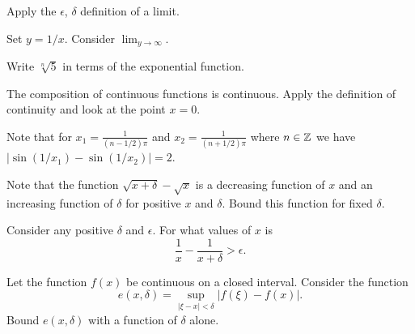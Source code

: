 

\begin{Hint}
  \label{hint lim sin 1/x}
  Apply the $\epsilon$, $\delta$ definition of a limit.
\end{Hint}





\begin{Hint}
  \label{hint lim x sin 1/x}
  Set $y = 1/x$.  Consider $\lim_{y \to \infty}$.
\end{Hint}


\begin{Hint}
  \label{hint limit sqrt n 5}
  Write $\sqrt[n]{5}$ in terms of the exponential function.
\end{Hint}





\begin{Hint}
  \label{hint sin 1/x continuous}
  The composition of continuous functions is continuous.
  Apply the definition of continuity and look at the point $x = 0$.
\end{Hint}


\begin{Hint}
  \label{hint sin 1/x uniformly continuous}
  Note that for $x_1 = \frac{1}{(n-1/2) \pi}$ and $x_2 = \frac{1}{(n+1/2) \pi}$ 
  where $n \in \mathbb{Z}$ we have $| \sin(1/x_1) - \sin(1/x_2)| = 2$.  
\end{Hint}


\begin{Hint}
  \label{hint sqrt x uniformly continuous}
  Note that the function $\sqrt{x + \delta} - \sqrt{x}$ is a decreasing 
  function of $x$ and an increasing function of $\delta$ for positive $x$ 
  and $\delta$.  Bound this function for fixed $\delta$.

  Consider any positive $\delta$ and $\epsilon$.  For what values of $x$ is
  \[
  \frac{1}{x} - \frac{1}{x+\delta} > \epsilon.
  \]
\end{Hint}



\begin{Hint}
  \label{hint continuous closed uniformly}
  Let the function $f(x)$ be continuous on a closed interval.
  Consider the function 
  \[
  e(x,\delta) = \sup_{|\xi-x|<\delta} | f(\xi) - f(x) |.
  \]
  Bound $e(x,\delta)$ with a function of $\delta$ alone.
\end{Hint}








